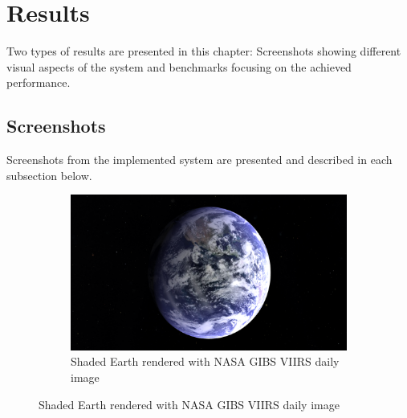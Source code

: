 \chapter{Results}
\label{chapter:results}
Two types of results are presented in this chapter: Screenshots showing different visual aspects of the system and benchmarks focusing on the achieved performance.

\section{Screenshots}
Screenshots from the implemented system are presented and described in each subsection below. 

\begin{figure}[h]
  \centering
  \begin{subfigure}[bt]{0.9\textwidth}
    \includegraphics[width=\textwidth]{figures/results/screenshots/specular_earth.png}
    \caption{Shaded Earth rendered with NASA GIBS VIIRS daily image \cite{gibs}}
  \end{subfigure}
\end{figure}

\clearpage
